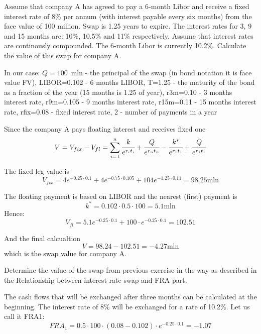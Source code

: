 \documentclass[12pt,a4paper]{exam}
\begin{document}
\begin{questions}
\question Assume that company A has agreed to pay a 6-month Libor and receive a fixed interest rate of 8\% per annum (with interest payable every six months) from the face value of 100 million. Swap is 1.25 years to expire. The interest rates for 3, 9 and 15 months are: 10\%, 10.5\% and 11\% respectively. Assume that interest rates are continously compounded. The 6-month Libor is currently 10.2\%. Calculate the value of this swap for company A.

\begin{solution}
In our case: $Q= 100$~mln - the principal of the swap (in bond notation it is face value FV), LIBOR=0.102 - 6 months LIBOR, T=1.25 - the maturity of the bond as a fraction of the year (15 months is 1.25 of year), r3m=0.10 - 3 months interest rate, r9m=0.105 - 9 months interest rate, r15m=0.11 - 15 months interest rate, rfix=0.08 - fixed interest rate, 2 - number of payments in a year

Since the company A pays floating interest and receives fixed one
\begin{equation*}
V=V_{fix}-V_{fl} = \sum_{i=1}^n \cfrac{k}{e^{r_i t_i}} + \cfrac{Q}{e^{r_n t_n}} - \cfrac{k^*}{e^{r_1 t_1}}+\cfrac{Q}{e^{r_1 t_1}}
\end{equation*}

The fixed leg value is
\begin{equation*}
V_{fix} = 4e^{-0.25\cdot 0.1} +  4e^{-0.75\cdot 0.105} +  104e^{-1.25\cdot 0.11} = 98.25\text{mln}
\end{equation*}

The floating payment is based on LIBOR and the nearest (first) payment is 
\begin{equation*}
k^*=0.102\cdot0.5\cdot 100 = 5.1\text{mln}
\end{equation*}
Hence:
\begin{equation*}
V_{fl}=5.1e^{-0.25\cdot 0.1}+100\cdot e^{-0.25\cdot 0.1} = 102.51
\end{equation*}

And the final calcualtion
\begin{equation*}
V = 98.24-102.51=-4.27\text{mln}
\end{equation*}
which is the swap value for company A.
\end{solution}

\question Determine the value of the swap from previous exercise in the way as described in the Relationship between interest rate swap and FRA part.
\begin{solution}
The cash flows that will be exchanged after three months can be calculated at the beginning. The interest rate of 8\% will be exchanged for a rate of 10.2\%. Let us call it FRA1:
\begin{equation*}
FRA_1 = 0.5\cdot 100\cdot (0.08-0.102)\cdot e^{-0.25\cdot 0.1}=-1.07
\end{equation*}


\end{solution}
\end{questions}
\end{document}
